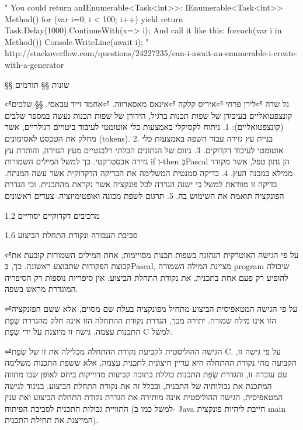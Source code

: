         "
        You could return anIEnumerable<Task<int>>:
        IEnumerable<Task<int>> Method() { for (var i=0; i < 100; i++) { yield return Task.Delay(1000).ContinueWith(x=> i); }}
        And call it like this:
        foreach(var i in Method()) Console.WriteLine(await i);
        "
        http://stackoverflow.com/questions/24227235/can-i-await-an-enumerable-i-create-with-a-generator

        §§ שונות
        §§ תורמים
        \begin{ציינון}
⏎גל שדה
⏎לירן פרחי
⏎איריס קלקה
⏎אינאס מאסארווה.
⏎אחמד זייד עבאסי.
        §§ שלבים קונצפטואליים בעיבודן של שפות תכנות
        ברגיל, הידורן של שפות תכנות נעשה במספר שלבים (קונצפטואליים):
        1. ניתוח לקסיקלי באמצעות כלי אוטומטי לעיבוד ביטויים רגולריים, אשר מחלק את הטכסט לאסימונים (tokens).
        2. בניית עץ גזירה עבור השפה באמצעות כלי אוטומטי לעיבוד דקדוקים.
        3. גיזום של הנתונים הבלתי רלבנטיים מעץ הגזירה, והותרת עץ גזירה אבסטרקטי. כך למשל המילים השמורות if וְ-then בְּPascal הן נתון טפל, אשר מקודד ממילא במבנה העץ.
        4. בדיקה סמנטית המשלימה את הבדיקה הדקדוקית אשר עשה המנתח. בדיקה זו מוודאת למשל כי ישנה הגדרה לכל פונקציה אשר נקראת מהתכנית, וכי הגדרת הפונקציה תואמת את השימוש בה.
        5. תרגום לשפת מכונה ואופטימיזציה.
        צעדים ראשונים
    \end{ציינון}

        1.2 מרכיבים דקדוקיים יסודיים

        1.6 סביבת העבודה ונקודת התחלת הביצוע
        \begin{ציינון}
⏎על פי הגישה האוטרקית הנהוגה בשפות תכנות מסויימות, אחת המילים השמורות קובעת את קבוצת הפקודות שתבוצע ראשונה. כך, בְּPascal, מציינת המילה השמורה program שיכולה להופיע רק פעם אחת בתכנית, את נקודת התחלת הביצוע. אין סיפריות נוספות רק הסיפריה המוגדרת מראש בשפה.
      \end{ציינון}

      \begin{ציינון}
⏎על פי הגישה המטאפיסית הביצוע מתחיל מפונקציה בעלת שם מסוים, אלא ששם הפונקציה הזו אינו מילה שמורה. יתירה מכך, הגדרת נקודת ההתחלה הזו אינה חלק מהגדרת שְׂפַת התכנות עצמה. גישה זו מיוצגת על ידי שְׂפַת C למשל.
      \end{ציינון}

      \begin{ציינון}
⏎הגישה ההוליסטית לקביעת נקודת ההתחלה מכלילה את זו של שְׂפַת C. על פי גישה זו, הקביעה מהי נקודת ההתחלה היא עדיין חיצונית לתכנית עצמה, אלא ששפת התכנות משלימה עם עובדה זו, והגדרת שְׂפַת התכנות כוללת בתוכה קביעות מדוייקות ביחס לאופן שבו מתווה המתכנת את גבולותיה של התכנית, ובכלל זה את נקודת התחלת הביצוע. בניגוד לגישה המטאפיסית, הגישה ההוליסטית אינה מותירה את הגדרת נקודת התחלת הביצוע ואת ענין התוויית גבולות התכנית לסביבת הפיתוח (למשל כמו ב- Java חייבת ליהיות פונקצית main המייצגת את תחילת התכנית).
      \end{ציינון}

